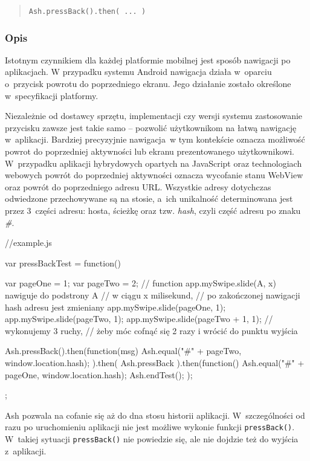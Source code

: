 \documentclass[brudnopis]{xmgr}
\begin{document}
\begin{quote}
  \texttt{Ash.pressBack().then( ... )} 
\end{quote}

\subsubsection{Opis}

Istotnym czynnikiem dla każdej platformie mobilnej jest sposób nawigacji po aplikacjach.  W przypadku systemu Android nawigacja działa w~oparciu o~przycisk powrotu do poprzedniego ekranu. Jego działanie zostało określone w~specyfikacji platformy.

Niezależnie od dostawcy sprzętu, implementacji czy wersji systemu zastosowanie przycisku zawsze jest takie samo -- pozwolić użytkownikom na łatwą nawigację w~aplikacji. Bardziej precyzyjnie nawigacja~w tym kontekście  oznacza możliwość powrot do poprzedniej aktywności lub ekranu prezentowanego użytkownikowi. W~przypadku aplikacji hybrydowych opartych na JavaScript oraz technologiach webowych powrót do poprzedniej aktywności oznacza wycofanie stanu WebView oraz powrót do poprzedniego adresu URL. Wszystkie adresy dotychczas odwiedzone przechowywane są na stosie, a~ich unikalność determinowana jest przez 3~części adresu: hosta, ścieżkę oraz tzw. \textit{hash}, czyli część adresu po znaku \textit{\#}. 

\begin{javascriptcode}
   //example.js

  var pressBackTest = function(){
    var pageOne = 1;
    var pageTwo = 2;
    // function app.mySwipe.slide(A, x) nawiguje do podstrony A 
    // w ciągu x milisekund,
    // po zakończonej nawigacji hash adresu jest zmieniany
    app.mySwipe.slide(pageOne, 1); 
    app.mySwipe.slide(pageTwo, 1); 
    app.mySwipe.slide(pageTwo + 1, 1); //  wykonujemy 3 ruchy, 
       //  żeby móc cofnąć się 2 razy i wrócić do punktu wyjścia 
    
    Ash.pressBack().then(function(msg){
      Ash.equal("#" + pageTwo, window.location.hash);
    }).then(
      Ash.pressBack
    ).then(function(){
      Ash.equal("#" + pageOne, window.location.hash);
      Ash.endTest();
    });
  };
\end{javascriptcode}

Ash pozwala na cofanie się aż do dna stosu historii aplikacji. W~szczególności od razu po uruchomieniu aplikacji nie jest możliwe wykonie funkcji \texttt{pressBack()}. W~takiej sytuacji \texttt{pressBack()} nie powiedzie się, ale nie dojdzie też do wyjścia z~aplikacji.
\end{document}
